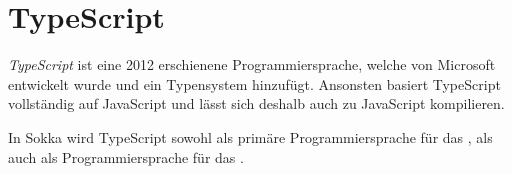\section{TypeScript}
\label{typescript}

\textit{TypeScript} ist eine 2012 erschienene Programmiersprache, welche von Microsoft entwickelt wurde und \textit{} ein Typensystem hinzufügt. Ansonsten basiert TypeScript vollständig auf JavaScript und lässt sich deshalb auch zu JavaScript kompilieren.

In Sokka wird TypeScript sowohl als primäre Programmiersprache für das , als auch als Programmiersprache für das .